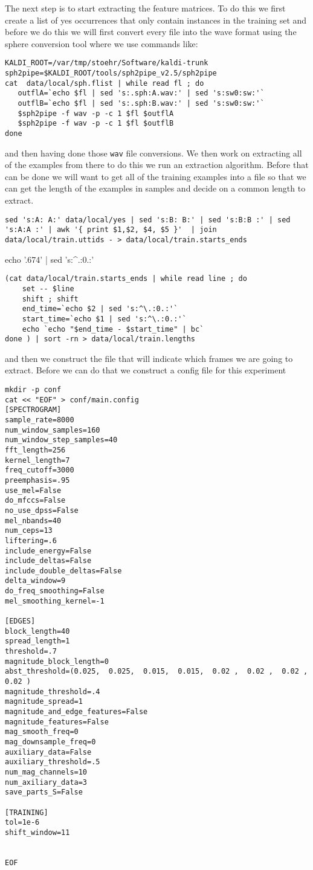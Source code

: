 \documentclass{article}
\begin{document}
The next step is to start extracting the feature matrices. To do
this we first create a list of yes occurrences that only
contain instances in the training set and before we do this we will
first convert every file into the wave format using the
sphere conversion tool where we use commands like:
\begin{verbatim}
KALDI_ROOT=/var/tmp/stoehr/Software/kaldi-trunk
sph2pipe=$KALDI_ROOT/tools/sph2pipe_v2.5/sph2pipe
cat  data/local/sph.flist | while read fl ; do
   outflA=`echo $fl | sed 's:.sph:A.wav:' | sed 's:sw0:sw:'`
   outflB=`echo $fl | sed 's:.sph:B.wav:' | sed 's:sw0:sw:'`
   $sph2pipe -f wav -p -c 1 $fl $outflA
   $sph2pipe -f wav -p -c 1 $fl $outflB
done
\end{verbatim}
and then having done those \texttt{wav} file conversions. We
then work on extracting all of the examples from there to do
this we run an extraction algorithm.  Before that can be done
we will want to get all of the training examples into a file
so that we can get the length of the examples in samples
and decide on a common length to extract.
\begin{verbatim}
sed 's:A: A:' data/local/yes | sed 's:B: B:' | sed 's:B:B :' | sed 's:A:A :' | awk '{ print $1,$2, $4, $5 }'  | join data/local/train.uttids - > data/local/train.starts_ends
\end{verbatim}
echo '.674' | sed 's:^.:0.:'
\begin{verbatim}
(cat data/local/train.starts_ends | while read line ; do
    set -- $line
    shift ; shift
    end_time=`echo $2 | sed 's:^\.:0.:'`
    start_time=`echo $1 | sed 's:^\.:0.:'`
    echo `echo "$end_time - $start_time" | bc`
done ) | sort -rn > data/local/train.lengths
\end{verbatim}
and then we construct the file that will indicate which
frames we are going to extract.  Before we can do that
we construct a config file for this experiment
\begin{verbatim}
mkdir -p conf
cat << "EOF" > conf/main.config
[SPECTROGRAM]
sample_rate=8000
num_window_samples=160
num_window_step_samples=40
fft_length=256
kernel_length=7
freq_cutoff=3000
preemphasis=.95
use_mel=False
do_mfccs=False
no_use_dpss=False
mel_nbands=40
num_ceps=13
liftering=.6
include_energy=False
include_deltas=False
include_double_deltas=False
delta_window=9
do_freq_smoothing=False
mel_smoothing_kernel=-1

[EDGES]
block_length=40
spread_length=1
threshold=.7
magnitude_block_length=0
abst_threshold=(0.025,  0.025,  0.015,  0.015,  0.02 ,  0.02 ,  0.02 ,  0.02 )
magnitude_threshold=.4
magnitude_spread=1
magnitude_and_edge_features=False
magnitude_features=False
mag_smooth_freq=0
mag_downsample_freq=0
auxiliary_data=False
auxiliary_threshold=.5
num_mag_channels=10
num_axiliary_data=3
save_parts_S=False

[TRAINING]
tol=1e-6
shift_window=11


EOF
\end{verbatim}
\end{document}
